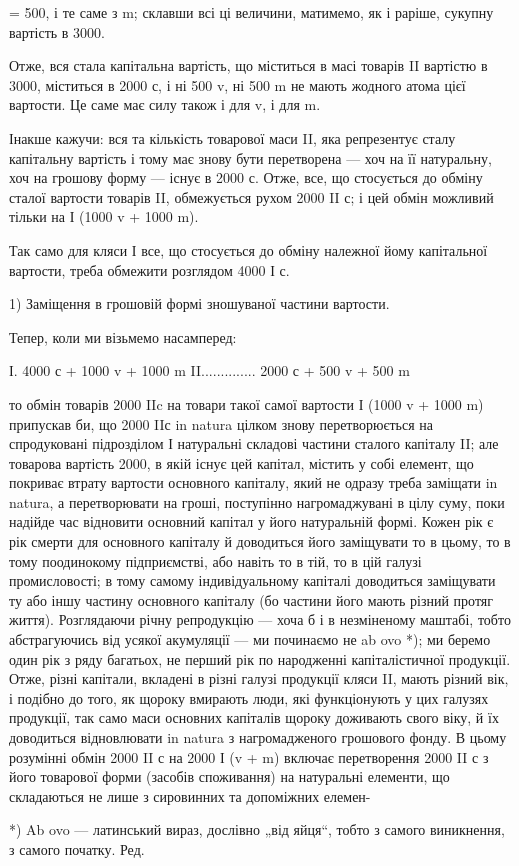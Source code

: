 = 500, і те саме з m; склавши всі ці величини, матимемо, як і раріше,
сукупну вартість в 3000.

Отже, вся стала капітальна вартість, що міститься в масі товарів II
вартістю в 3000, міститься в 2000 с, і ні 500 v, ні 500 m не мають
жодного атома цієї вартости. Це саме має силу також і для v, і для m.

Інакше кажучи: вся та кількість товарової маси II, яка репрезентує
сталу капітальну вартість і тому має знову бути перетворена — хоч
на її натуральну, хоч на грошову форму — існує в 2000 с. Отже, все, що
стосується до обміну сталої вартости товарів II, обмежується рухом 2000
II с; і цей обмін можливий тільки на І (1000 v + 1000 m).

Так само для кляси І все, що стосується до обміну належної йому
капітальної вартости, треба обмежити розглядом 4000 І с.

1) Заміщення в грошовій формі зношуваної частини вартости.

Тепер, коли ми візьмемо насамперед:

І. 4000 с + 1000 v + 1000 m
II..............  2000 с + 500 v + 500 m

то обмін товарів 2000 IIc на товари такої самої вартости І (1000 v +
1000 m) припускав би, що 2000 IIс in natura цілком знову перетворюється
на спродуковані підрозділом І натуральні складові частини сталого
капіталу II; але товарова вартість 2000, в якій існує цей капітал,
містить у собі елемент, що покриває втрату вартости основного капіталу,
який не одразу треба заміщати in natura, а перетворювати на гроші, поступінно
нагромаджувані в цілу суму, поки надійде час відновити
основний капітал у його натуральній формі. Кожен рік є рік смерти для
основного капіталу й доводиться його заміщувати то в цьому, то в тому
поодинокому підприємстві, або навіть то в тій, то в цій галузі промисловості;
в тому самому індивідуальному капіталі доводиться заміщувати
ту або іншу частину основного капіталу (бо частини його мають різний
протяг життя). Розглядаючи річну репродукцію — хоча б і в незміненому
маштабі, тобто абстрагуючись від усякої акумуляції — ми починаємо не
ab ovo *); ми беремо один рік з ряду багатьох, не перший рік по
народженні капіталістичної продукції. Отже, різні капітали, вкладені
в різні галузі продукції кляси II, мають різний вік, і подібно до того,
як щороку вмирають люди, які функціонують у цих галузях продукції,
так само маси основних капіталів щороку доживають свого віку, й їх доводиться
відновлювати in natura з нагромадженого грошового фонду. В
цьому розумінні обмін 2000 II с на 2000 І (v + m) включає перетворення
2000 II с з його товарової форми (засобів споживання) на натуральні
елементи, що складаються не лише з сировинних та допоміжних елемен-

*) Ab ovo — латинський вираз, дослівно „від яйця“, тобто з самого виникнення,
з самого початку. Ред.
